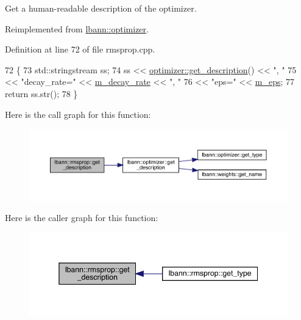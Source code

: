 Get a human-\/readable description of the optimizer. 

Reimplemented from \hyperlink{classlbann_1_1optimizer_a66bb8d28dfb41452ac1a75a3efd47723}{lbann\+::optimizer}.



Definition at line 72 of file rmsprop.\+cpp.


\begin{DoxyCode}
72                                          \{
73   std::stringstream ss;
74   ss << \hyperlink{classlbann_1_1optimizer_a66bb8d28dfb41452ac1a75a3efd47723}{optimizer::get\_description}() << \textcolor{stringliteral}{", "}
75      << \textcolor{stringliteral}{"decay\_rate="} << \hyperlink{classlbann_1_1rmsprop_a9cd712c44e7c4995120e2933b0387d71}{m\_decay\_rate} << \textcolor{stringliteral}{", "}
76      << \textcolor{stringliteral}{"eps="} << \hyperlink{classlbann_1_1rmsprop_a6ea73caf5b2769451dfd798665877208}{m\_eps};
77   \textcolor{keywordflow}{return} ss.str();
78 \}
\end{DoxyCode}
Here is the call graph for this function\+:\nopagebreak
\begin{figure}[H]
\begin{center}
\leavevmode
\includegraphics[width=350pt]{classlbann_1_1rmsprop_a4526482bf60f7f3fc3f60ff70b38cdb7_cgraph}
\end{center}
\end{figure}
Here is the caller graph for this function\+:\nopagebreak
\begin{figure}[H]
\begin{center}
\leavevmode
\includegraphics[width=345pt]{classlbann_1_1rmsprop_a4526482bf60f7f3fc3f60ff70b38cdb7_icgraph}
\end{center}
\end{figure}
\mbox{\label{classlbann_1_1rmsprop_aa4299a19c0ab81a41ccebb9486f106b6}} 
